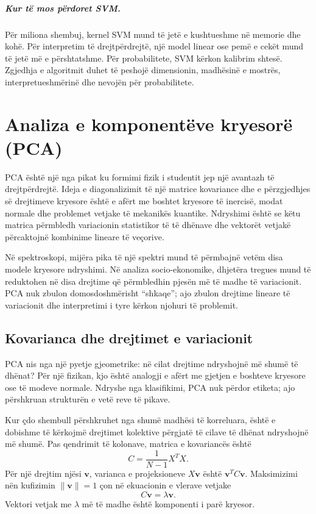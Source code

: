 \documentclass[12pt,a4paper,oneside]{book}
\begin{document}
\paragraph{Kur të mos përdoret SVM.}
Për miliona shembuj, kernel SVM mund të jetë e kushtueshme në memorie dhe kohë. Për interpretim të drejtpërdrejtë, një model linear ose pemë e cekët mund të jetë më e përshtatshme. Për probabilitete, SVM kërkon kalibrim shtesë. Zgjedhja e algoritmit duhet të peshojë dimensionin, madhësinë e mostrës, interpretueshmërinë dhe nevojën për probabilitete.

\chapter[PCA]{Analiza e komponentëve kryesorë (PCA)}

PCA është një nga pikat ku formimi fizik i studentit jep një avantazh të drejtpërdrejtë. Ideja e diagonalizimit të një matrice kovariance dhe e përzgjedhjes së drejtimeve kryesore është e afërt me boshtet kryesore të inercisë, modat normale dhe problemet vetjake të mekanikës kuantike. Ndryshimi është se këtu matrica përmbledh variacionin statistikor të të dhënave dhe vektorët vetjakë përcaktojnë kombinime lineare të veçorive.

Në spektroskopi, mijëra pika të një spektri mund të përmbajnë vetëm disa modele kryesore ndryshimi. Në analiza socio-ekonomike, dhjetëra tregues mund të reduktohen në disa drejtime që përmbledhin pjesën më të madhe të variacionit. PCA nuk zbulon domosdoshmërisht ``shkaqe''; ajo zbulon drejtime lineare të variacionit dhe interpretimi i tyre kërkon njohuri të problemit.
\section{Kovarianca dhe drejtimet e variacionit}

PCA nis nga një pyetje gjeometrike: në cilat drejtime ndryshojnë më shumë të dhënat? Për një fizikan, kjo është analogji e afërt me gjetjen e boshteve kryesore ose të modeve normale. Ndryshe nga klasifikimi, PCA nuk përdor etiketa; ajo përshkruan strukturën e vetë reve të pikave.

Kur çdo shembull përshkruhet nga shumë madhësi të korreluara, është e dobishme të kërkojmë drejtimet kolektive përgjatë të cilave të dhënat ndryshojnë më shumë. Pas qendrimit të kolonave, matrica e kovariancës është
\[
C=\frac{1}{N-1}X^TX.
\]
Për një drejtim njësi $\mathbf v$, varianca e projeksioneve $X\mathbf v$ është $\mathbf v^TC\mathbf v$. Maksimizimi nën kufizimin $\|\mathbf v\|=1$ çon në ekuacionin e vlerave vetjake
\[
C\mathbf v=\lambda\mathbf v.
\]
Vektori vetjak me $\lambda$ më të madhe është komponenti i parë kryesor.
\end{document}
